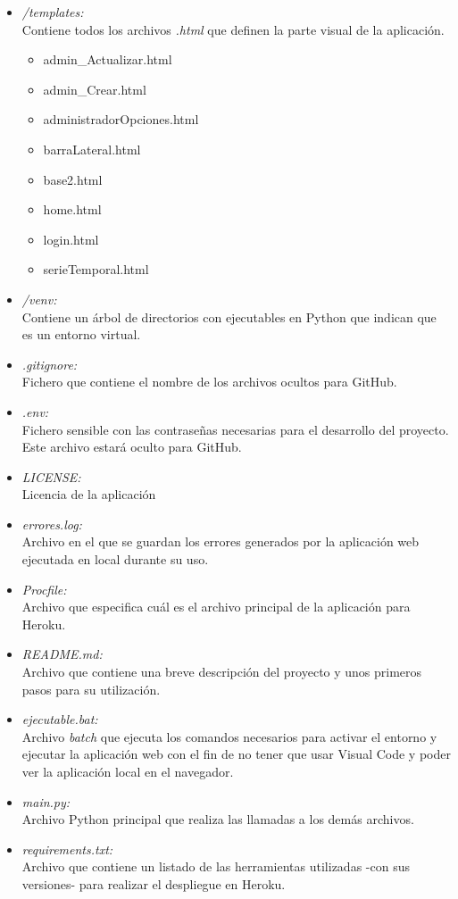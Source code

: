 \begin{itemize}
    \item \textit{/templates:}\\
    Contiene todos los archivos \textit{.html} que definen la parte visual de la aplicación.
    \begin{itemize}
        \item admin\_Actualizar.html
        \item admin\_Crear.html
        \item administradorOpciones.html
        \item barraLateral.html
        \item base2.html
        \item home.html
        \item login.html
        \item serieTemporal.html
    \end{itemize}
    \item \textit{/venv:}\\
    Contiene un árbol de directorios con ejecutables en Python que indican que es un entorno virtual.
    \item \textit{.gitignore:}\\
    Fichero que contiene el nombre de los archivos ocultos para GitHub.
    \item \textit{.env:}\\
    Fichero sensible con las contraseñas necesarias para el desarrollo del proyecto. Este archivo estará oculto para GitHub.
    \item \textit{LICENSE:}\\
    Licencia de la aplicación
    \item \textit{errores.log:}\\
    Archivo en el que se guardan los errores generados por la aplicación web ejecutada en local durante su uso.
    \item \textit{Procfile:}\\
    Archivo que especifica cuál es el archivo principal de la aplicación para Heroku.
    \item \textit{README.md:}\\
    Archivo que contiene una breve descripción del proyecto y unos primeros pasos para su utilización.
    \item \textit{ejecutable.bat:}\\
    Archivo \textit{batch} que ejecuta los comandos necesarios para activar el entorno y ejecutar la aplicación web con el fin de no tener que usar Visual Code y poder ver la aplicación local en el navegador.
    \item \textit{main.py:}\\
    Archivo Python principal que realiza las llamadas a los demás archivos.
    \item \textit{requirements.txt:}\\
    Archivo que contiene un listado de las herramientas utilizadas -con sus versiones- para realizar el despliegue en Heroku.
    
\end{itemize}



